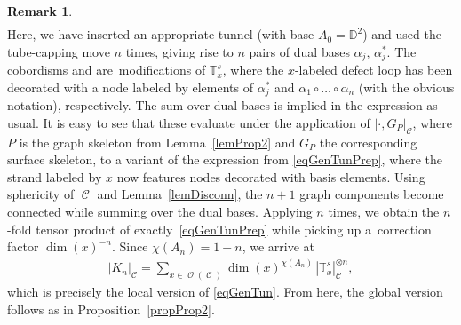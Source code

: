 \documentclass[pdftex]{sigma}
\DeclareMathOperator{\calc}{\mathcal{C}}
\DeclareMathOperator{\calo}{\mathcal{O}}
\numberwithin{equation}{section}
\theoremstyle{definition}
\newtheorem{Remark}[Remark]{Remark}
\begin{document}
\begin{Remark}
\begin{align*}
 \end{align*}
 Here, we have inserted an appropriate tunnel (with base $A_0 = \mathbb{D}^2$) and used the tube-capping move $n$ times, giving rise to $n$ pairs of dual bases $\alpha_j$, $\alpha_j^*$. The cobordisms  and  are~modifications of $\mathbb{T}_{x}^s$, where the $x$-labeled defect loop has been decorated with a node labeled by elements of $\alpha_j^*$ and $\alpha_1 \circ \dots \circ \alpha_n$ (with the obvious notation), respectively. The sum over dual bases is implied in the expression as usual. It is easy to see that these evaluate under the application of $| \cdot , G_P|_{\calc}$, where $P$ is the graph skeleton from Lemma~\ref{lemProp2} and $G_P$ the corresponding surface skeleton, to a variant of the expression from \eqref{eqGenTunPrep}, where the strand labeled by $x$ now features nodes decorated with basis elements. Using sphericity of $\calc$ and Lemma~\ref{lemDisconn}, the ${n+1}$ graph components become connected while summing over the dual bases. Applying \cite[Lemma~12.3]{TV} $n$ times, we obtain the $n$-fold tensor product of exactly~\eqref{eqGenTunPrep} while picking up a~correction factor $\dim(x)^{-n}$. Since $\chi(A_n) = 1-n$, we arrive at
 \begin{align*}
 |K_n|_{\calc} = \sum_{x \in \calo(\calc)} \dim(x)^{\chi(A_n)} \, |\mathbb{T}_x^s|_{\calc}^{ \otimes n},
 \end{align*}
 which is precisely the local version of \eqref{eqGenTun}. From here, the global version follows as in Proposition~\ref{propProp2}.
\end{Remark}
\end{document}
